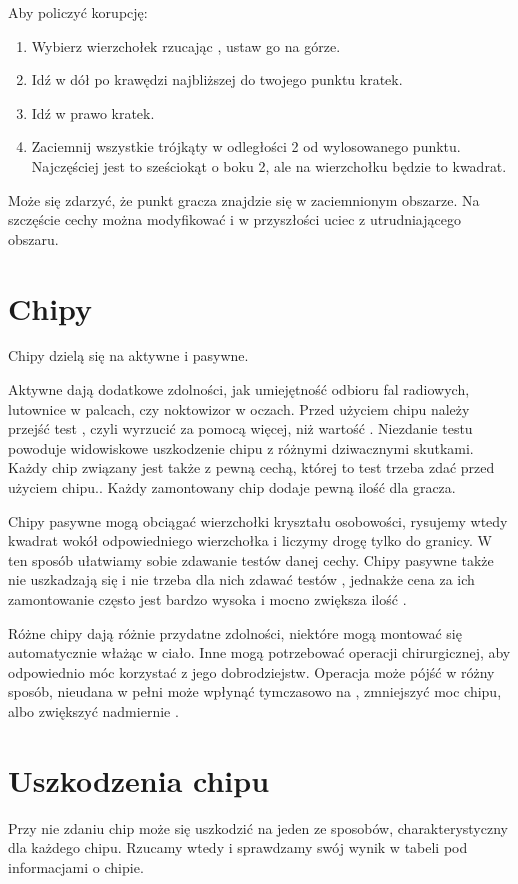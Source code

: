 Aby policzyć korupcję:
\begin{enumerate}
 \item Wybierz wierzchołek rzucając \dvi, ustaw go na górze.
 \item Idź w dół po krawędzi najbliższej do twojego punktu \dxx kratek.
 \item Idź w prawo \dxx[2] kratek.
 \item Zaciemnij wszystkie trójkąty w odległości 2 od wylosowanego punktu. Najczęściej jest to sześciokąt o boku 2, ale na wierzchołku będzie to kwadrat.
\end{enumerate}
Może się zdarzyć, że punkt gracza znajdzie się w zaciemnionym obszarze. 
Na szczęście cechy można modyfikować i w przyszłości uciec z utrudniającego obszaru.

\section{Chipy}
Chipy dzielą się na aktywne i pasywne.

Aktywne dają dodatkowe zdolności, jak umiejętność odbioru fal radiowych, lutownice w palcach, czy noktowizor w oczach.
Przed użyciem chipu należy przejść test \abnkp, czyli wyrzucić za pomocą \dxx więcej, niż wartość \abnkp. 
Niezdanie testu \abnkp powoduje widowiskowe uszkodzenie chipu z różnymi dziwacznymi skutkami.
Każdy chip związany jest także z pewną cechą, której to test trzeba zdać przed użyciem chipu..
Każdy zamontowany chip dodaje pewną ilość \abnkp dla gracza.

Chipy pasywne mogą obciągać wierzchołki kryształu osobowości, rysujemy wtedy kwadrat wokół odpowiedniego wierzchołka i liczymy drogę tylko do granicy.
W ten sposób ułatwiamy sobie zdawanie testów danej cechy.
Chipy pasywne także nie uszkadzają się i nie trzeba dla nich zdawać testów \abnkp, jednakże cena za ich zamontowanie często jest bardzo wysoka i mocno zwiększa ilość \abnkp.

Różne chipy dają różnie przydatne zdolności, niektóre mogą montować się automatycznie włażąc w ciało.
Inne mogą potrzebować operacji chirurgicznej, aby odpowiednio móc korzystać z jego dobrodziejstw.
Operacja może pójść w różny sposób, nieudana w pełni może wpłynąć tymczasowo na \abzyc, zmniejszyć moc chipu, albo zwiększyć nadmiernie \abnkp.

\section{Uszkodzenia chipu}
Przy nie zdaniu \abnkp chip może się uszkodzić na jeden ze sposobów, charakterystyczny dla każdego chipu.
Rzucamy wtedy \dxx i sprawdzamy swój wynik w tabeli pod informacjami o chipie.

